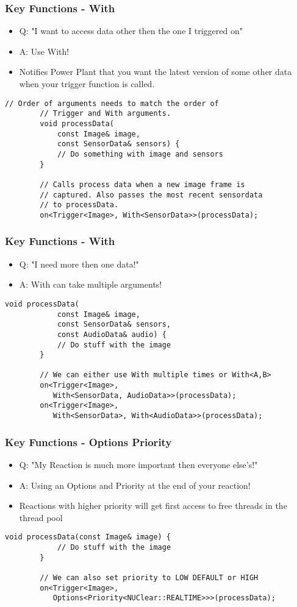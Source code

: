 \documentclass{beamer}
\begin{document}
\begin{frame}[fragile]
	\frametitle {Key Functions - With}
	\begin{itemize}
		\item Q: "I want to access data other then the one I triggered on"
		\item A: Use With!
		\item Notifies Power Plant that you want the latest version of some other data when your trigger function is called.
	\end{itemize}

	\begin{lstlisting}[language=nuclear]
		// Order of arguments needs to match the order of 
		// Trigger and With arguments.
		void processData(
		    const Image& image,
		    const SensorData& sensors) {
		    // Do something with image and sensors
		}

		// Calls process data when a new image frame is 
		// captured. Also passes the most recent sensordata
		// to processData.
		on<Trigger<Image>, With<SensorData>>(processData);
	\end{lstlisting}
\end{frame}

\begin{frame}[fragile]
	\frametitle {Key Functions - With}
	\begin{itemize}
		\item Q: "I need more then one data!"
		\item A: With can take multiple arguments!
	\end{itemize}

	\begin{lstlisting}[language=nuclear]
		void processData(
		    const Image& image,
		    const SensorData& sensors,
		    const AudioData& audio) {
		    // Do stuff with the image
		}

		// We can either use With multiple times or With<A,B>
		on<Trigger<Image>, 
		   With<SensorData, AudioData>>(processData);
		on<Trigger<Image>, 
		   With<SensorData>, With<AudioData>>(processData);
	\end{lstlisting}
\end{frame}

\begin{frame}[fragile]
	\frametitle {Key Functions - Options Priority}
	\begin{itemize}
		\item Q: "My Reaction is much more important then everyone else's!"
		\item A: Using an Options and Priority at the end of your reaction!
		\item Reactions with higher priority will get first access to free threads in the thread pool
	\end{itemize}

	\begin{lstlisting}[language=nuclear]
		void processData(const Image& image) {
		    // Do stuff with the image
		}

		// We can also set priority to LOW DEFAULT or HIGH
		on<Trigger<Image>,
		   Options<Priority<NUClear::REALTIME>>>(processData);
	\end{lstlisting}
\end{frame}
\end{document}
